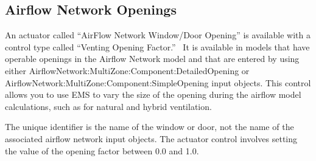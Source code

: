 \subsection{Airflow Network Openings}\label{airflow-network-openings}

An actuator called ``AirFlow Network Window/Door Opening'' is available with a control type called ``Venting Opening Factor.''~ It is available in models that have operable openings in the Airflow Network model and that are entered by using either AirflowNetwork:MultiZone:Component:DetailedOpening or AirflowNetwork:MultiZone:Component:SimpleOpening input objects. This control allows you to use EMS to vary the size of the opening during the airflow model calculations, such as for natural and hybrid ventilation.

The unique identifier is the name of the window or door, not the name of the associated airflow network input objects. The actuator control involves setting the value of the opening factor between 0.0 and 1.0.
